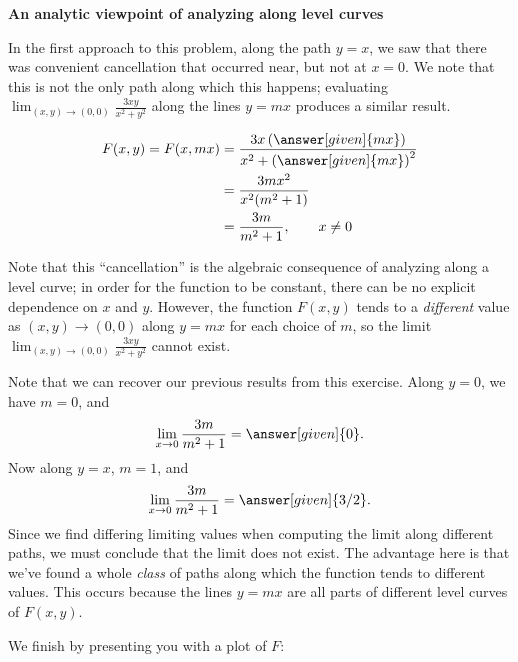 \documentclass{ximera}
\newcommand{\point}[1]{\left(#1\right)} %
\begin{document}
\textbf{An analytic viewpoint of analyzing along level curves}
\begin{explanation}
In the first approach to this problem, along the path $y=x$, we saw that there was convenient cancellation that occurred near, but not at $x=0$.  We note that this is not the only path along which this happens; evaluating $\lim_{\point{x,y}\to\point{0,0}} \frac{3xy}{x^2+y^2}$ along the lines $y=mx$ produces a similar result.

    \begin{align*}
    F(x,y) = F(x,mx) &= \frac{3x\left(\answer[given]{m x}\right)}{x^2+\left(\answer[given]{mx}\right)^2}  \\
    &= \frac{3mx^2}{x^2(m^2+1)}\\
      &= \frac{3m}{m^2+1}, \qquad x \neq 0\\
    \end{align*}
    
    Note that this ``cancellation'' is the algebraic consequence of analyzing along a level curve; in order for the function to be constant, there can be no explicit dependence on $x$ and $y$.   However, the function $F(x,y)$ tends to a \textit{different} value as $(x,y) \to (0,0)$ along $y=mx$ for each choice of $m$, so the limit $\lim_{\point{x,y}\to\point{0,0}} \frac{3xy}{x^2+y^2}$ cannot exist.
    
 \begin{remark}   
    Note that we can recover our previous results from this exercise.  Along $y=0$, we have $m=0$, and
       \[
    \lim_{x\to 0}\frac{3m}{m^2+1} = \answer[given]{0}.
    \]
    Now along $y=x$, $m=1$, and
    \[
    \lim_{x\to 0}\frac{3m}{m^2+1} = \answer[given]{3/2}.
    \]
    Since we find differing limiting values when computing the limit
    along different paths, we must conclude that the limit does not
    exist.  The advantage here is that we've found a whole \emph{class} of paths along which the function tends to different values.  This occurs because the lines $y=mx$ are all parts of different level curves of $F(x,y)$.
    \end{remark}
        
    \begin{onlineOnly}
      We finish by presenting you with a plot of $F$:
      \begin{center}
      \end{center}
    \end{onlineOnly}
    
  \end{explanation}
\end{document}
